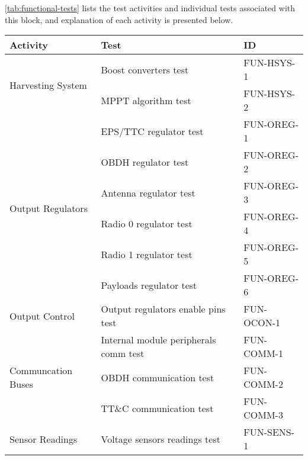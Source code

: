 \autoref{tab:functional-tests} lists the test activities and individual tests associated with this block, and explanation of each activity is presented below.

\begin{table}[htp]
    \small
    \centering
    \begin{tabular}{lll}
        \toprule
        \textbf{Activity}                           & \textbf{Test}                                 & \textbf{ID}   \\
        \midrule
        \midrule
        \multirow{2}{*}{Harvesting System}          & Boost converters test                         & FUN-HSYS-1      \\
                                                    & MPPT algorithm test                           & FUN-HSYS-2      \\
        \midrule
        \multirow{6}{*}{Output Regulators}          & EPS/TTC regulator test                        & FUN-OREG-1     \\
                                                    & OBDH regulator test                           & FUN-OREG-2     \\
                                                    & Antenna regulator test                        & FUN-OREG-3     \\
                                                    & Radio 0 regulator test                        & FUN-OREG-4     \\
                                                    & Radio 1 regulator test                        & FUN-OREG-5     \\
                                                    & Payloads regulator test                       & FUN-OREG-6     \\
        \midrule
        \multirow{1}{*}{Output Control}             & Output regulators enable pins test            & FUN-OCON-1     \\
        \midrule
        \multirow{3}{*}{Communcation Buses}         & Internal module peripherals comm test         & FUN-COMM-1     \\
                                                    & OBDH communication test                       & FUN-COMM-2     \\
                                                    & TT\&C communication test                      & FUN-COMM-3     \\
        \midrule
        \multirow{3}{*}{Sensor Readings}            & Voltage sensors readings test                 & FUN-SENS-1     \\

\end{tabular}
\end{table}
